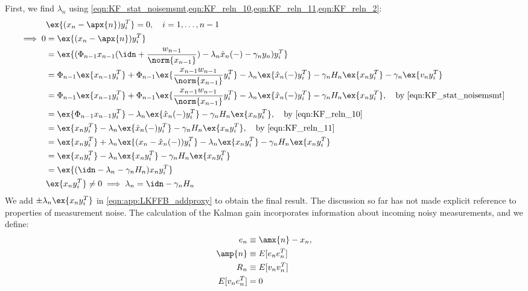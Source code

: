 First, we find $\lambda_n$ using \cref{eqn:KF_stat_noisemsmt,eqn:KF_reln_10,eqn:KF_reln_11,eqn:KF_reln_2}:
\begin{align}
&\ex{(x_n - \apx{n})y_i^T} =0, \quad i = 1,\dots, n-1\label{eqn:KF_reln_15}\\ 
\implies 0 & = \ex{(x_n - \apx{n})y_i^T} \\
& = \ex{(\Phi_{n-1}x_{n-1}(\idn + \frac{w_{n-1}}{\norm{x_{n-1}}}) - \lambda_n \hat{x}_n(-) - \gamma_n y_n)y_i^T} \\
& = \Phi_{n-1}\ex{x_{n-1}y_i^T} + \Phi_{n-1}\ex{\frac{x_{n-1}w_{n-1}}{\norm{x_{n-1}}}y_i^T}  - \lambda_n \ex{ \hat{x}_n(-)y_i^T} - \gamma_n H_n \ex{ x_n y_i^T}  - \gamma_n \ex{ v_n y_i^T}  \\
&= \Phi_{n-1}\ex{x_{n-1}y_i^T} + \Phi_{n-1}\ex{\frac{x_{n-1}w_{n-1}}{\norm{x_{n-1}}}y_i^T} - \lambda_n \ex{ \hat{x}_n(-)y_i^T} - \gamma_n H_n\ex{ x_n y_i^T}, \quad \text{by \ref{eqn:KF_stat_noisemsmt} } \\
&= \ex{\Phi_{n-1}x_{n-1}y_i^T} - \lambda_n \ex{ \hat{x}_n(-)y_i^T} - \gamma_n H_n\ex{ x_n y_i^T}, \quad \text{by \ref{eqn:KF_reln_10} } \\
&=\ex{x_{n}y_i^T} - \lambda_n \ex{ \hat{x}_n(-)y_i^T} - \gamma_n H_n\ex{ x_n y_i^T}, \quad \text{by \ref{eqn:KF_reln_11}} \\
&= \ex{x_{n}y_i^T} + \lambda_n \ex{( x_n - \hat{x}_n(-))y_i^T} - \lambda_n \ex{ x_n y_i^T}  - \gamma_n H_n\ex{ x_n y_i^T} \label{eqn:app:LKFFB_addproxy}  \\
&= \ex{x_{n}y_i^T} - \lambda_n \ex{ x_n y_i^T} - \gamma_n H_n\ex{ x_n y_i^T}\\
& = \ex{(\idn - \lambda_n  - \gamma_n H_n)x_n y_i^T} \\
&\ex{x_n y_i^T} \neq 0 \implies \lambda_n = \idn  - \gamma_n H_n
\end{align} We add $\pm \lambda_n \ex{ x_n y_i^T}$ in \cref{eqn:app:LKFFB_addproxy} to obtain the final result. 
The discussion so far has not made explicit reference to properties of measurement noise. The calculation of the Kalman gain incorporates information about incoming noisy measurements, and we define:
\begin{align}
e_n & \equiv \amx{n} - x_n,   \label{eqn:app:LKFFB_resid}\\
\amp{n} & \equiv E[e_ne_n^T] \label{eqn:app:LKFFB_P}\\
R_n & \equiv E[v_nv_n^T] \label{eqn:app:LKFFB_R}\\
E[v_n e_n^T]&=0 \label{eqn:app:LKFFB_uncorr_resid}
\end{align}
